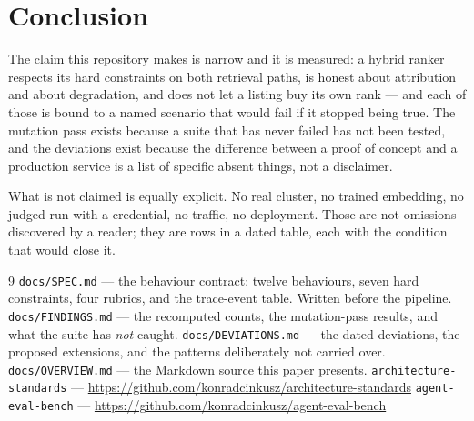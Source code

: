 \documentclass[11pt,a4paper]{article}
\begin{document}
\section{Conclusion}

The claim this repository makes is narrow and it is measured: a hybrid ranker
respects its hard constraints on both retrieval paths, is honest about
attribution and about degradation, and does not let a listing buy its own rank
--- and each of those is bound to a named scenario that would fail if it
stopped being true. The mutation pass exists because a suite that has never
failed has not been tested, and the deviations exist because the difference
between a proof of concept and a production service is a list of specific
absent things, not a disclaimer.

What is not claimed is equally explicit. No real cluster, no trained
embedding, no judged run with a credential, no traffic, no deployment. Those
are not omissions discovered by a reader; they are rows in a dated table, each
with the condition that would close it.

\begin{thebibliography}{9}
 \texttt{docs/SPEC.md} --- the behaviour contract: twelve
behaviours, seven hard constraints, four rubrics, and the trace-event table.
Written before the pipeline.
 \texttt{docs/FINDINGS.md} --- the recomputed counts, the
mutation-pass results, and what the suite has \emph{not} caught.
 \texttt{docs/DEVIATIONS.md} --- the dated deviations,
the proposed extensions, and the patterns deliberately not carried over.
 \texttt{docs/OVERVIEW.md} --- the Markdown source this
paper presents.
 \texttt{architecture-standards} ---
\url{https://github.com/konradcinkusz/architecture-standards}
 \texttt{agent-eval-bench} ---
\url{https://github.com/konradcinkusz/agent-eval-bench}
\end{thebibliography}
\end{document}
